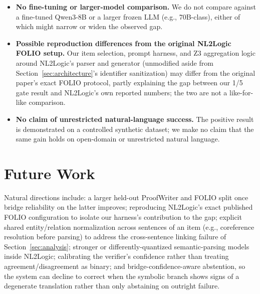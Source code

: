 \documentclass[conference]{IEEEtran}
\begin{document}
\begin{itemize}
\item \textbf{No fine-tuning or larger-model comparison.} We do not compare against a fine-tuned Qwen3-8B or a larger frozen LLM (e.g., 70B-class), either of which might narrow or widen the observed gap.
\item \textbf{Possible reproduction differences from the original NL2Logic FOLIO setup.} Our item selection, prompt harness, and Z3 aggregation logic around NL2Logic's parser and generator (unmodified aside from Section~\ref{sec:architecture}'s identifier sanitization) may differ from the original paper's exact FOLIO protocol, partly explaining the gap between our 1/5 gate result and NL2Logic's own reported numbers; the two are not a like-for-like comparison.
\item \textbf{No claim of unrestricted natural-language success.} The positive result is demonstrated on a controlled synthetic dataset; we make no claim that the same gain holds on open-domain or unrestricted natural language.
\end{itemize}

\section{Future Work}
\label{sec:future}
Natural directions include: a larger held-out ProofWriter and FOLIO split once bridge reliability on the latter improves; reproducing NL2Logic's exact published FOLIO configuration to isolate our harness's contribution to the gap; explicit shared entity/relation normalization across sentences of an item (e.g., coreference resolution before parsing) to address the cross-sentence linking failure of Section~\ref{sec:analysis}; stronger or differently-quantized semantic-parsing models inside NL2Logic; calibrating the verifier's confidence rather than treating agreement/disagreement as binary; and bridge-confidence-aware abstention, so the system can decline to correct when the symbolic branch shows signs of a degenerate translation rather than only abstaining on outright failure.
\end{document}
